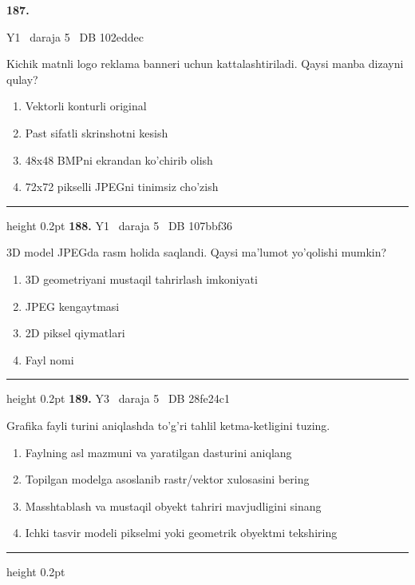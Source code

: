 \documentclass[10pt,a4paper,oneside]{article}
\begin{document}
\hypertarget{q187}{\textbf{\color{ink}187.}}  {\color{muted}\scriptsize Y1 \textbullet\ daraja 5 \textbullet\ DB 102eddec}
\par
Kichik matnli logo reklama banneri uchun kattalashtiriladi. Qaysi manba dizayni qulay?
\begin{enumerate}[label=\Alph*),leftmargin=9mm]
\item Vektorli konturli original
\item Past sifatli skrinshotni kesish
\item 48x48 BMPni ekrandan ko'chirib olish
\item 72x72 pikselli JPEGni tinimsiz cho'zish
\end{enumerate}
\vspace{2mm}\hrule height 0.2pt \vspace{4mm}
\hypertarget{q188}{\textbf{\color{ink}188.}}  {\color{muted}\scriptsize Y1 \textbullet\ daraja 5 \textbullet\ DB 107bbf36}
\par
3D model JPEGda rasm holida saqlandi. Qaysi ma'lumot yo'qolishi mumkin?
\begin{enumerate}[label=\Alph*),leftmargin=9mm]
\item 3D geometriyani mustaqil tahrirlash imkoniyati
\item JPEG kengaytmasi
\item 2D piksel qiymatlari
\item Fayl nomi
\end{enumerate}
\vspace{2mm}\hrule height 0.2pt \vspace{4mm}
\hypertarget{q189}{\textbf{\color{ink}189.}}  {\color{muted}\scriptsize Y3 \textbullet\ daraja 5 \textbullet\ DB 28fe24c1}
\par
Grafika fayli turini aniqlashda to'g'ri tahlil ketma-ketligini tuzing.
\begin{enumerate}[label=\Alph*),leftmargin=9mm]
\item Faylning asl mazmuni va yaratilgan dasturini aniqlang
\item Topilgan modelga asoslanib rastr/vektor xulosasini bering
\item Masshtablash va mustaqil obyekt tahriri mavjudligini sinang
\item Ichki tasvir modeli pikselmi yoki geometrik obyektmi tekshiring
\end{enumerate}
\vspace{2mm}\hrule height 0.2pt \vspace{4mm}
\end{document}
